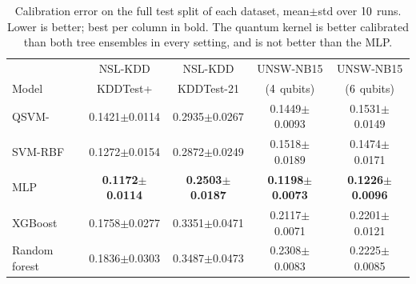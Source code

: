 \begin{table}[t]
\centering
\caption{Calibration error on the full test split of each dataset, mean$\pm$std over $10$ runs. Lower is better; best per column in bold. The quantum kernel is better calibrated than both tree ensembles in every setting, and is not better than the MLP.}
\label{tab:main}
\begin{tabular}{lcccc}
\toprule
 & NSL-KDD & NSL-KDD & UNSW-NB15 & UNSW-NB15 \\
Model & KDDTest+ & KDDTest-21 & ($4$ qubits) & ($6$ qubits) \\
\midrule
QSVM-\ZZ{} & 0.1421$\pm$0.0114 & 0.2935$\pm$0.0267 & 0.1449$\pm$0.0093 & 0.1531$\pm$0.0149 \\
SVM-RBF & 0.1272$\pm$0.0154 & 0.2872$\pm$0.0249 & 0.1518$\pm$0.0189 & 0.1474$\pm$0.0171 \\
MLP & \textbf{0.1172$\pm$0.0114} & \textbf{0.2503$\pm$0.0187} & \textbf{0.1198$\pm$0.0073} & \textbf{0.1226$\pm$0.0096} \\
XGBoost & 0.1758$\pm$0.0277 & 0.3351$\pm$0.0471 & 0.2117$\pm$0.0071 & 0.2201$\pm$0.0121 \\
Random forest & 0.1836$\pm$0.0303 & 0.3487$\pm$0.0473 & 0.2308$\pm$0.0083 & 0.2225$\pm$0.0085 \\
\bottomrule
\end{tabular}
\end{table}
